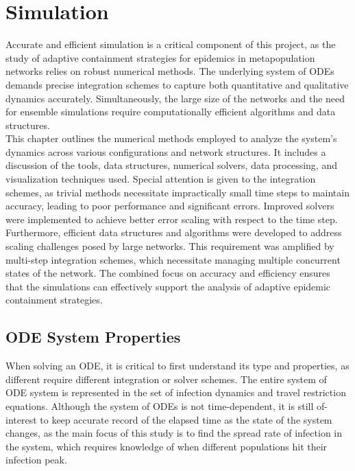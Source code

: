
\section{Simulation}
Accurate and efficient simulation is a critical component of this project, as the study of adaptive containment strategies for epidemics in metapopulation networks relies on robust numerical methods. The underlying system of ODEs demands precise integration schemes to capture both quantitative and qualitative dynamics accurately. Simultaneously, the large size of the networks and the need for ensemble simulations require computationally efficient algorithms and data structures.\\

This chapter outlines the numerical methods employed to analyze the system's dynamics across various configurations and network structures. It includes a discussion of the tools, data structures, numerical solvers, data processing, and visualization techniques used. Special attention is given to the integration schemes, as trivial methods necessitate impractically small time steps to maintain accuracy, leading to poor performance and significant errors. Improved solvers were implemented to achieve better error scaling with respect to the time step.\\

Furthermore, efficient data structures and algorithms were developed to address scaling challenges posed by large networks. This requirement was amplified by multi-step integration schemes, which necessitate managing multiple concurrent states of the network. The combined focus on accuracy and efficiency ensures that the simulations can effectively support the analysis of adaptive epidemic containment strategies.\\

\subsection{ODE System Properties}
When solving an ODE, it is critical to first understand its type and properties, as different require different integration or solver schemes. The entire system of ODE system is represented in the set of infection dynamics and travel restriction equations. Although the system of ODEs is not time-dependent, it is still of-interest to keep accurate record of the elapsed time as the state of the system changes, as the main focus of this study is to find the spread rate of infection in the system, which requires knowledge of when different populations hit their infection peak. 
\\

